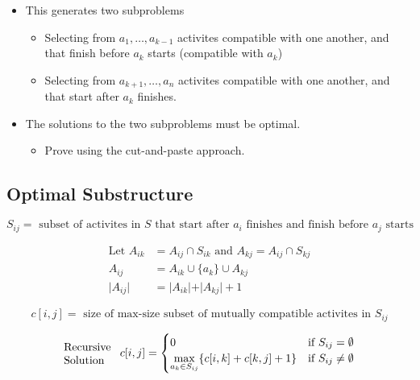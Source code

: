 \documentclass{article}
\begin{document}
\begin{itemize}
    \item This generates two subproblems
          \begin{itemize}
              \item Selecting from \(a_1, \ldots, a_{k-1}\) activites compatible with one another, and that finish before \(a_k\) starts (compatible with \(a_k\))
              \item Selecting from \(a_{k+1}, \ldots, a_n\) activites compatible with one another, and that start after \(a_k\) finishes.
          \end{itemize}
    \item The solutions to the two subproblems must be optimal.
          \begin{itemize}
              \item Prove using the cut-and-paste approach.
          \end{itemize}
\end{itemize}

\subsection*{Optimal Substructure}
\begin{equation*}
    S_{ij} = \text{ subset of activites in } S \text{ that start after } a_i \text{ finishes and finish before } a_j \text{ starts}
\end{equation*}

\begin{align*}
    \text{Let } A_{ik} & = A_{ij} \cap S_{ik} \text{ and } A_{kj} = A_{ij} \cap S_{kj} \\
    A_{ij}             & = A_{ik} \cup \{a_k\} \cup A_{kj}                             \\
    \vert A_{ij} \vert & = \vert A_{ik} \vert + \vert A_{kj} \vert + 1
\end{align*}

\begin{equation*}
    c[i, j] = \text{ size of max-size subset of mutually compatible activites in } S_{ij}
\end{equation*}

\begin{equation*}
    \parbox{5em}{Recursive\\Solution} c[i, j] = \begin{cases}
        0                                                        & \text{if } S_{ij} = \emptyset    \\
        \underset{a_k \in S_{ij}}{\max}\{c[i, k] + c[k, j] + 1\} & \text{if } S_{ij} \neq \emptyset
    \end{cases}
\end{equation*}
\end{document}
